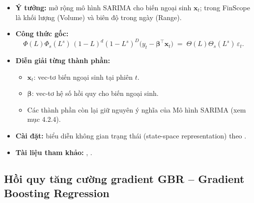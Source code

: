\documentclass[12pt,a4paper,openany,oneside]{report}
\numberwithin{equation}{chapter}
\begin{document}
\begin{itemize}[leftmargin=18pt,topsep=2pt,itemsep=4pt]
  \item \textbf{Ý tưởng:} mở rộng mô hình SARIMA cho biến ngoại sinh
        $\mathbf{x}_t$; trong FinScope là khối lượng (Volume) và biên
        độ trong ngày (Range).
  \item \textbf{Công thức gốc:}
        \begin{equation}
          \Phi(L)\Phi_s(L^s)\,(1-L)^d(1-L^s)^D\bigl(y_t -
          \boldsymbol{\beta}^{\!\top}\mathbf{x}_t\bigr)
          \;=\; \Theta(L)\Theta_s(L^s)\,\varepsilon_t.
          \label{eq:sarimax}
        \end{equation}
  \item \textbf{Diễn giải từng thành phần:}
        \begin{itemize}[leftmargin=14pt,topsep=2pt,itemsep=1pt]
          \item $\mathbf{x}_t$: vec-tơ biến ngoại sinh tại phiên $t$.
          \item $\boldsymbol{\beta}$: vec-tơ hệ số hồi quy cho biến
                ngoại sinh.
          \item Các thành phần còn lại giữ nguyên ý nghĩa của Mô hình
                SARIMA (xem mục 4.2.4).
        \end{itemize}
  \item \textbf{Cài đặt:} biểu diễn không gian trạng thái (state-space
        representation) theo \citet{Hyndman2008state}.
  \item \textbf{Tài liệu tham khảo:} \citet{BoxJenkinsReinsel2008},
        \citet{Hyndman2008state}.
\end{itemize}

\subsection{Hồi quy tăng cường gradient GBR -- Gradient Boosting Regression}
\end{document}

